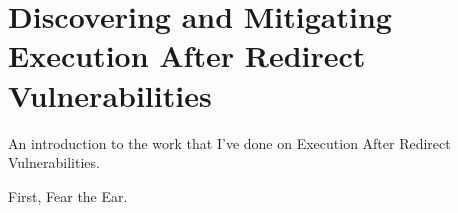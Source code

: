 \chapter{Discovering and Mitigating Execution After Redirect Vulnerabilities}
\label{fear-the-ear}

An introduction to the work that I've done on Execution After Redirect Vulnerabilities.

First, Fear the Ear.



